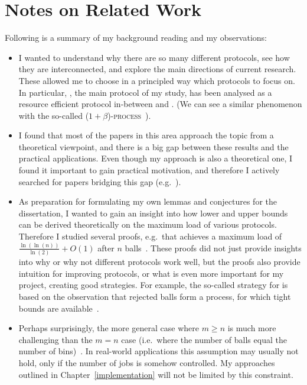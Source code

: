 
\chapter{Notes on Related Work}\label{related-work} 

Following is a summary of my background reading and my observations:


\begin{itemize}
    \item 
    I wanted to understand why there are so many different protocols, see how they are interconnected, and explore the main directions of current research. These allowed me to choose in a principled way which protocols to focus on. In particular, \TwoThinning, the main protocol of my study, has been analysed as a resource efficient protocol in-between \OneChoice and \TwoChoice. (We can see a similar phenomenon with the so-called \textsc{($1+\beta$)-process}~\cite{peres2015oneplusbeta}).
    \item
    I found that most of the papers in this area approach the topic from a theoretical viewpoint, and there is a big gap between these results and the practical applications. Even though my approach is also a theoretical one, I found it important to gain practical motivation, and therefore I actively searched for papers bridging this gap (e.g.~\cite{wang2017twochoicerouting}).
    \item
    As preparation for formulating my own lemmas and conjectures for the dissertation, I wanted to gain an insight into how lower and upper bounds can be derived theoretically on the maximum load of various protocols. Therefore I studied several proofs, e.g.\ that \TwoChoice achieves a maximum load of $\frac{\ln(\ln(n))}{\ln(2)} + O(1)$ after $n$ balls~\cite{azar1999twochoice}. These proofs did not just provide insights into why or why not different protocols work well, but the proofs also provide intuition for improving protocols, or what is even more important for my project, creating good strategies. For example, the so-called \Threshold strategy for \TwoThinning is based on the observation that rejected balls form a \OneChoice process, for which tight bounds are available~\cite{feldheim2021thinning}.
    \item
    Perhaps surprisingly, the more general case where $m\geq n$ is much more challenging than the $m=n$ case (i.e.\ where the number of balls equal the number of bins)~\cite{berenbrink2006heavilyloaded}. In real-world applications this assumption may usually not hold, only if the number of jobs is somehow controlled. My approaches outlined in Chapter~\ref{implementation} will not be limited by this constraint.

\end{itemize}
